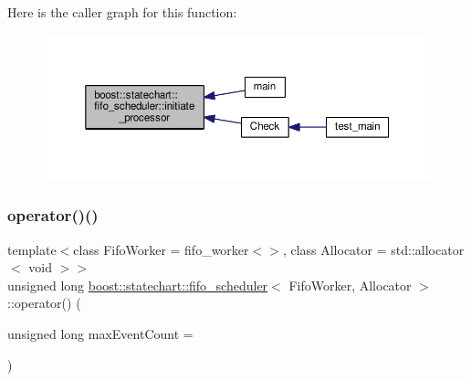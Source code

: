Here is the caller graph for this function\+:
\nopagebreak
\begin{figure}[H]
\begin{center}
\leavevmode
\includegraphics[width=350pt]{classboost_1_1statechart_1_1fifo__scheduler_a466f16a9904ebdb1123948d3d2b3cd66_icgraph}
\end{center}
\end{figure}
\mbox{\label{classboost_1_1statechart_1_1fifo__scheduler_ade6cb1d2bec98187dc1ec8efa834bba7}} 
\subsubsection{\texorpdfstring{operator()()}{operator()()}}
{\footnotesize\ttfamily template$<$class Fifo\+Worker = fifo\+\_\+worker$<$$>$, class Allocator = std\+::allocator$<$ void $>$$>$ \\
unsigned long \mbox{\hyperlink{classboost_1_1statechart_1_1fifo__scheduler}{boost\+::statechart\+::fifo\+\_\+scheduler}}$<$ Fifo\+Worker, Allocator $>$\+::operator() (\begin{DoxyParamCaption}\item[{unsigned long}]{max\+Event\+Count = {} }\end{DoxyParamCaption})\hspace{0.3cm}{\ttfamily [inline]}}

\mbox{\label{classboost_1_1statechart_1_1fifo__scheduler_a7b52d93108f6a45503005595ee2feffd}} 
